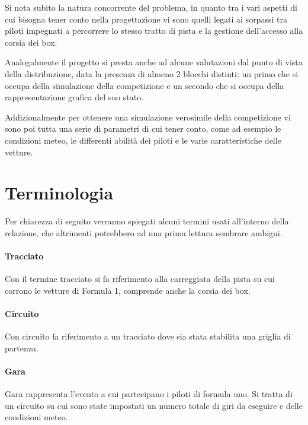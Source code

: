 \documentclass[a4paper,11pt, twoside]{book}
\begin{document}
      Si nota subito la natura concorrente del problema, in quanto tra i vari aspetti di cui bisogna tener conto
      nella progettazione vi sono quelli legati ai sorpassi tra piloti impegnati a percorrere lo stesso tratto di pista
      e la gestione dell'accesso alla corsia dei box.
      
      Analogalmente il progetto si presta anche ad alcune valutazioni dal punto di vista della distribuzione, data
      la presenza di almeno 2 blocchi distinti: un primo che si occupa della simulazione della competizione e un secondo
      che si occupa della rappresentazione grafica del suo stato.
      
      Addizionalmente per ottenere una simulazione verosimile
      della competizione 
      vi sono poi tutta una serie di parametri di cui tener conto, 
      come ad esempio le condizioni meteo, le differenti abilità dei piloti e le varie caratteristiche 
      delle vetture.

      
    
    \section{Terminologia}
      Per chiarezza di seguito verranno spiegati alcuni termini usati all'interno della relazione, 
      che altrimenti potrebbero ad una prima lettura sembrare ambigui.
      
      \paragraph{Tracciato}
        Con il termine tracciato si fa riferimento alla carreggiata della pista su cui corrono le vetture di Formula 1, 
	comprende anche la corsia dei box.
      
      \paragraph{Circuito}
        Con circuito fa riferimento a un tracciato dove sia stata stabilita una griglia di partenza.
	
      \paragraph{Gara}
        Gara rappresenta l'evento a cui partecipano i piloti di formula uno. Si tratta di un circuito
	su cui sono state impostati un numero totale di giri da eseguire e delle condizioni meteo.
	
\end{document}
